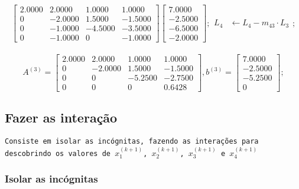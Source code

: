 \documentclass[12pt]{article}
\begin{document}
                \[
                \begin{bmatrix}
                    2.0000 & 2.0000 & 1.0000 & 1.0000 \\
                    0 & -2.0000 & 1.5000 & -1.5000 \\
                    0 & -1.0000 & -4.5000 & -3.5000 \\
                    0 & -1.0000 & 0 & -1.0000
                \end{bmatrix}
                \begin{bmatrix}
                        7.0000 \\ -2.5000 \\ -6.5000 \\ -2.0000
                \end{bmatrix};
                \begin{aligned}
                    L_4 &\leftarrow L_4 - m_{43} \cdot L_3
                \end{aligned};
                \]\\

                \[
                A^{(3)} = \begin{bmatrix}
                    2.0000 & 2.0000 & 1.0000 & 1.0000 \\
                    0 & -2.0000 & 1.5000 & -1.5000 \\
                    0 & 0 & -5.2500 & -2.7500 \\
                    0 & 0 & 0 & 0.6428
                \end{bmatrix},
                b^{(3)} = \begin{bmatrix}
                        7.0000 \\ -2.5000 \\ -5.2500 \\ 0
                \end{bmatrix};
                \]
                \newpage

        \subsection{Fazer as interação}

            \texttt{Consiste em isolar as incógnitas, fazendo as interações para descobrindo os valores de $x_1^{(k+1)}$, $x_2^{(k+1)}$, $x_3^{(k+1)}$ e $x_4^{(k+1)}$ }

            \subsubsection{Isolar as incógnitas}
\end{document}
